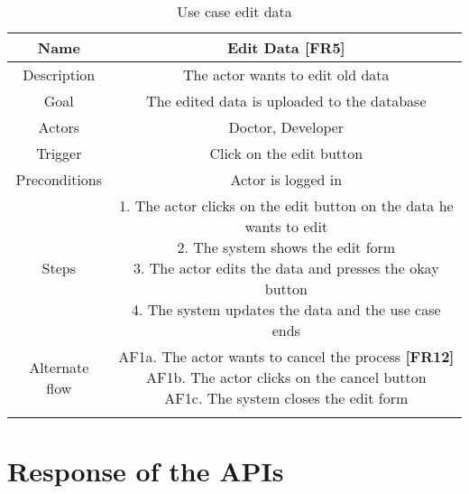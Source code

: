 \begin{table}[H]
	\begin{center}\scriptsize
		\begin{tabular}{ c|c }
			\hline
			Name & Edit Data \textbf{[FR5]} \\ 
			\hline	
			Description & The actor wants to edit old data \\ 
			\hline
			Goal & The edited data is uploaded to the database \\ 
			\hline
			Actors & Doctor, Developer \\ 
			\hline
			Trigger & Click on the edit button \\ 
			\hline
			Preconditions & Actor is logged in \\ 
			\hline
			Steps & \parbox{9cm}{\vspace{.5\baselineskip}
				1. The actor clicks on the edit button on the data he wants to edit\\
				2. The system shows the edit form\\
				3. The actor edits the data and presses the okay button\\
				4. The system updates the data and the use case ends
			}\\
			\hline
			Alternate flow & \parbox{9cm}{\vspace{.5\baselineskip}
				AF1a. The actor wants to cancel the process \textbf{[FR12]}\\
				AF1b. The actor clicks on the cancel button\\
				AF1c. The system closes the edit form}\\ \\ 
			\hline
		\end{tabular}
	\end{center}\normalsize
	\caption{Use case edit data}
\end{table}

\newpage
\scriptsize
\tocless\chapter{Response of the APIs}

